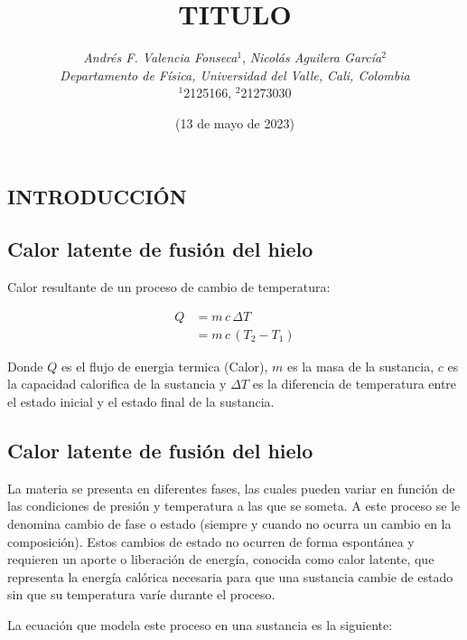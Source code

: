 \documentclass[10pt]{article}
\title{
    \textbf TITULO
}
\author{
    \normalsize{
        \emph{Andrés F. Valencia Fonseca}$^{1}$,
        \emph{Nicolás Aguilera García}$^{2}$
    } \\
    \normalsize{
        \emph{Departamento de Física, Universidad del Valle, Cali, Colombia}
    } \\
    \small{$^{1}$2125166, $^{2}$21273030}
}
\date{(\small 13 de mayo de 2023)}
\begin{document}
\maketitle
\begin{abstract}

\end{abstract}

\begin{multicols*}{2}
    \section{\small INTRODUCCIÓN}

    \subsection*{\small Calor latente de fusión del hielo}
    Calor resultante de un proceso de cambio de temperatura: %

    \begin{equation}
        \begin{split}
            Q &= m \, c \, \Delta T \\
            &= m \, c \, (T_2 - T_1)
        \end{split}
        \label{eq:flujo_calor}
    \end{equation}

    Donde $Q$ es el flujo de energia termica (Calor), $m$ es la masa de la sustancia, $c$ es la capacidad calorifica de la sustancia y $\Delta T$ es la diferencia de temperatura entre el estado inicial y el estado final de la sustancia.

    \subsection*{\small Calor latente de fusión del hielo}
    La materia se presenta en diferentes fases, las cuales pueden variar en función de las condiciones de presión y temperatura a las que se someta. A este proceso se le denomina cambio de fase o estado (siempre y cuando no ocurra un cambio en la composición). Estos cambios de estado no ocurren de forma espontánea y requieren un aporte o liberación de energía, conocida como calor latente, que representa la energía calórica necesaria para que una sustancia cambie de estado sin que su temperatura varíe durante el proceso.

    La ecuación que modela este proceso en una sustancia es la siguiente:


\end{multicols*}
\end{document}
